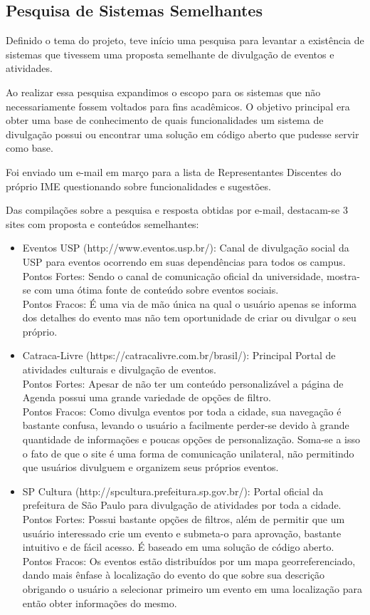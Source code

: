 \subsection{Pesquisa de Sistemas Semelhantes}
\par Definido o tema do projeto, teve início uma pesquisa para levantar a existência de sistemas que tivessem uma proposta semelhante de divulgação de eventos e atividades.
\par Ao realizar essa pesquisa expandimos o escopo para os sistemas que não necessariamente fossem voltados para fins acadêmicos. O objetivo principal era obter uma base de conhecimento de quais funcionalidades um sistema de divulgação possui ou  encontrar uma solução em código aberto que pudesse servir como base.
 \par Foi enviado um e-mail em março para a lista de Representantes Discentes do próprio IME questionando sobre funcionalidades e sugestões.
\par Das compilações sobre a pesquisa e resposta obtidas por e-mail, destacam-se 3 sites com proposta e conteúdos semelhantes:
\begin{itemize}
\item{Eventos USP (http://www.eventos.usp.br/):}
Canal de divulgação social da USP para eventos ocorrendo em suas dependências para todos os campus.\\
Pontos Fortes: Sendo o canal de comunicação oficial da universidade, mostra-se com uma ótima fonte de conteúdo sobre eventos sociais.\\
Pontos Fracos: É uma via de mão única na qual o usuário apenas se informa dos detalhes do evento mas não tem oportunidade de criar ou divulgar o seu próprio.
\item {Catraca-Livre (https://catracalivre.com.br/brasil/):} Principal Portal de atividades culturais e divulgação de eventos.\\
Pontos Fortes: Apesar de não ter um conteúdo personalizável a página de Agenda possui uma grande variedade de opções de filtro.\\
Pontos Fracos: Como divulga eventos por toda a cidade, sua navegação é bastante confusa, levando o usuário a facilmente perder-se devido à grande quantidade de informações e poucas opções de personalização. Soma-se a isso o fato de que o site é uma forma de comunicação unilateral, não permitindo que usuários divulguem e organizem seus próprios eventos.
\item {SP Cultura (http://spcultura.prefeitura.sp.gov.br/):} Portal oficial da prefeitura de São Paulo para divulgação de atividades por toda a cidade.\\
Pontos Fortes: Possui bastante opções de filtros, além de permitir que um usuário interessado crie um evento e submeta-o para aprovação, bastante intuitivo e de fácil acesso. É baseado em uma solução de código aberto.\\
Pontos Fracos: Os eventos estão distribuídos por um mapa georreferenciado, dando mais ênfase à localização do evento do que sobre sua descrição obrigando o usuário a selecionar primeiro um evento em uma localização para então obter informações do mesmo.
\end{itemize}
